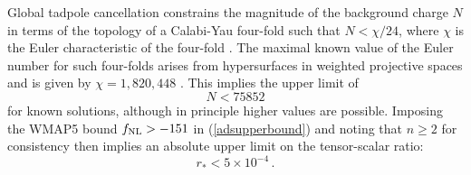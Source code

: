 Global tadpole cancellation constrains the magnitude of
the background charge $N$ in terms of the topology of 
a Calabi-Yau four-fold such that $N < \chi /
24$, where $\chi$ is the Euler characteristic of the four-fold
\cite{witten1,witten2,witten3,sethi,gkp,klemm}. 
The  maximal known value of the Euler number for such four-folds arises from 
hypersurfaces in weighted projective spaces and is given by 
$\chi = 1, 820,448$ \cite{klemm}. This implies the upper limit of 
\begin{equation}
\label{Nlimit-multi} 
N < 75852
\end{equation}
for known solutions, although in principle higher values are possible. 
Imposing the WMAP5 bound $f_{\mathrm{NL}}>-151$ in (\ref{adsupperbound})
and noting that $n \ge 2$ for consistency then implies an absolute
upper limit 
on the tensor-scalar ratio: 
\begin{equation}
\label{absupperlimit}
r_* < 5 \times 10^{-4} \, .
\end{equation}

